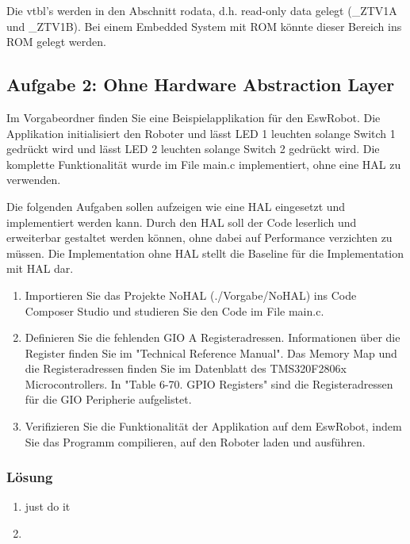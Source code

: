   Die vtbl's werden in den Abschnitt rodata, d.h. read-only data gelegt (\_ZTV1A und \_ZTV1B). Bei einem Embedded System mit ROM könnte dieser Bereich ins ROM gelegt werden.

\subsection{Aufgabe 2: Ohne Hardware Abstraction Layer}

Im Vorgabeordner finden Sie eine Beispielapplikation für den EswRobot. Die Applikation initialisiert den Roboter und lässt LED 1 leuchten solange Switch 1 gedrückt wird und lässt LED 2 leuchten solange Switch 2 gedrückt wird. Die komplette Funktionalität wurde im File main.c implementiert, ohne eine HAL zu verwenden.

Die folgenden Aufgaben sollen aufzeigen wie eine HAL eingesetzt und implementiert werden kann. Durch den HAL soll der Code leserlich und erweiterbar gestaltet werden können, ohne dabei auf Performance verzichten zu müssen. Die Implementation ohne HAL stellt die Baseline für die Implementation mit HAL dar.

\begin{enumerate}
  \item Importieren Sie das Projekte NoHAL (./Vorgabe/NoHAL) ins Code Composer Studio und studieren Sie den Code im File main.c.
  \item Definieren Sie die fehlenden GIO A Registeradressen. Informationen über die Register finden Sie im "Technical Reference Manual". Das Memory Map und die Registeradressen finden Sie im Datenblatt des TMS320F2806x Microcontrollers. In "Table 6-70. GPIO Registers" sind die Registeradressen für die GIO Peripherie aufgelistet.
  \item Verifizieren Sie die Funktionalität der Applikation auf dem EswRobot, indem Sie das Programm compilieren, auf den Roboter laden und ausführen.
\end{enumerate}

\subsubsection{Lösung}

\begin{enumerate}
  \item just do it
  \item 
\end{enumerate}

